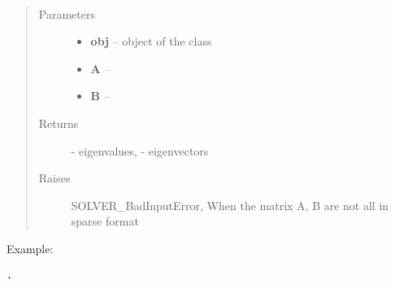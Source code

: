 \documentclass[letterpaper,10pt,english]{sphinxmanual}
\begin{document}
\begin{fulllineitems}
\label{index:brake.solve.solver.gev_sparse}~\begin{quote}\begin{description}
\item[{Parameters}] \leavevmode\begin{itemize}
\item {} 
\textbf{obj} -- object of the class 

\item {} 
\textbf{A} -- 

\item {} 
\textbf{B} -- 

\end{itemize}

\item[{Returns}] \leavevmode
{} - eigenvalues,  - eigenvectors

\item[{Raises }] \leavevmode
SOLVER\_BadInputError, When the matrix A, B are not all in sparse format

\end{description}\end{quote}

Example:

\begin{Verbatim}[commandchars=\\\{\}]
.
\end{Verbatim}

\end{fulllineitems}

\end{document}
